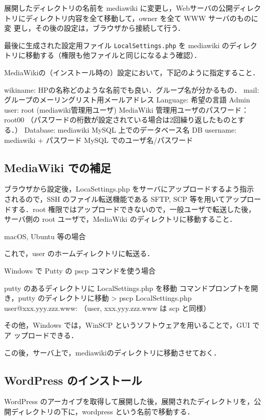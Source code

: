 展開したディレクトリの名前を mediawiki に変更し，Webサーバの公開ディレク
トリにディレクトリ内容を全て移動して，owner を全て WWW サーバのものに変
更し，その後の設定は，ブラウザから接続して行う．

最後に生成された設定用ファイル \texttt{LocalSettings.php} を mediawiki 
のディレクトリに移動する（権限も他ファイルと同じになるよう確認）．

MediaWikiの（インストール時の）設定において，下記のように指定すること．

\begin{cli}
wikiname: HPの名称どのような名前でも良い．グループ名が分かるもの．
mail: グループのメーリングリスト用メールアドレス
Language: 希望の言語
Admin user: root (mediawiki管理用ユーザ)
        MediaWiki 管理用ユーザのパスワード：root00
        （パスワードの桁数が設定されている場合は2回繰り返したものとする．）
Database: mediawiki
        MySQL 上でのデータベース名
DB username: mediawiki
        + パスワード
        MySQL でのユーザ名/パスワード
\end{cli}

\subsection*{MediaWiki での補足}

ブラウザから設定後，LocaSettings.php をサーバにアップロードするよう指示
されるので，SSH のファイル転送機能である SFTP, SCP 等を用いてアップロー
ドする．root 権限ではアップロードできないので，一般ユーザで転送した後，
サーバ側の root ユーザで，MediaWiki のディレクトリに移動すること．

macOS, Ubuntu 等の場合
これで，user のホームディレクトリに転送る．

Windows で Putty の pscp コマンドを使う場合
\begin{cli}
putty のあるディレクトリに LocalSettings.php を移動
コマンドプロンプトを開き，putty のディレクトリに移動
> pscp LocalSettings.php user@xxx.yyy.zzz.www:
（user, xxx.yyy.zzz.www は scp と同様）
\end{cli}
その他，Windows では，WinSCP というソフトウェアを用いることで，GUI でア
ップロードできる．

この後，サーバ上で，mediawikiのディレクトリに移動させておく．

\subsection{WordPress のインストール}
WordPress のアーカイブを取得して展開した後，展開されたディレクトリを，公
開ディレクトリの下に，wordpress という名前で移動する．

